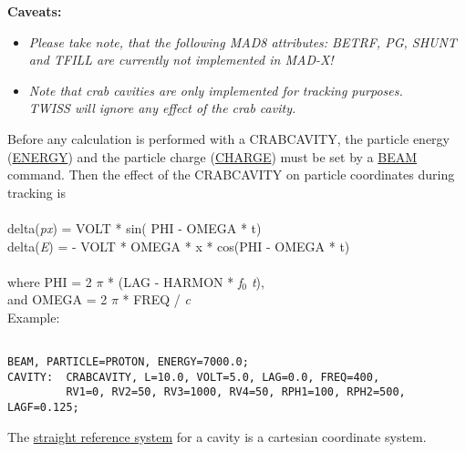 {\bf Caveats:}
\begin{itemize}
   \item \textit{ Please take note, that the following MAD8 attributes:
     BETRF, PG, SHUNT and TFILL are currently not implemented in MAD-X!}
   \item \textit{ Note that crab cavities are only implemented for
     tracking  purposes. \\ TWISS will ignore any effect of the crab cavity.  
% 
}
\end{itemize} 


Before any calculation is performed with a CRABCAVITY, the particle energy (\href{beam.html#energy}{ENERGY}) and the particle charge (\href{beam.html#charge}{CHARGE}) must be set by a \href{beam.html}{BEAM} command.  
Then the effect of the CRABCAVITY on particle coordinates during tracking is
\\
\\ delta(\textit{px})  = VOLT * sin( PHI - OMEGA * t) 
\\ delta(\textit{E})  = -  VOLT * OMEGA * x * cos(PHI - OMEGA * t) 
\\ 
\\ where PHI =  2 $\pi$ * (LAG - HARMON * \textit{f$_0$ t}), 
\\ and OMEGA = 2 $\pi$ * FREQ / \textit{c}
\\


Example: 
\begin{verbatim}

BEAM, PARTICLE=PROTON, ENERGY=7000.0;
CAVITY:  CRABCAVITY, L=10.0, VOLT=5.0, LAG=0.0, FREQ=400,
         RV1=0, RV2=50, RV3=1000, RV4=50, RPH1=100, RPH2=500, LAGF=0.125;

\end{verbatim} 

The \href{local_system.html#straight}{straight reference system} for a cavity is a cartesian coordinate system. 


